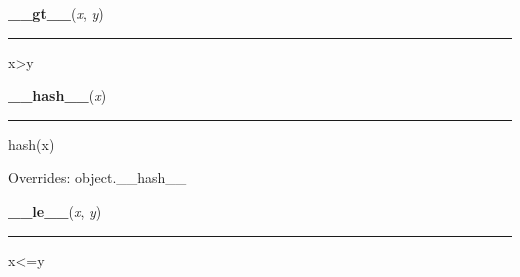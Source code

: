     \label{posix:stat_result:__gt__}

    \vspace{0.5ex}

\hspace{.8\funcindent}\begin{boxedminipage}{\funcwidth}

    \raggedright \textbf{\_\_gt\_\_}(\textit{x}, \textit{y})

    \vspace{-1.5ex}

    \rule{\textwidth}{0.5\fboxrule}
\setlength{\parskip}{2ex}
    x{\textgreater}y

\setlength{\parskip}{1ex}
    \end{boxedminipage}

    \vspace{0.5ex}

\hspace{.8\funcindent}\begin{boxedminipage}{\funcwidth}

    \raggedright \textbf{\_\_hash\_\_}(\textit{x})

    \vspace{-1.5ex}

    \rule{\textwidth}{0.5\fboxrule}
\setlength{\parskip}{2ex}
    hash(x)

\setlength{\parskip}{1ex}
      Overrides: object.\_\_hash\_\_

    \end{boxedminipage}

    \label{posix:stat_result:__le__}

    \vspace{0.5ex}

\hspace{.8\funcindent}\begin{boxedminipage}{\funcwidth}

    \raggedright \textbf{\_\_le\_\_}(\textit{x}, \textit{y})

    \vspace{-1.5ex}

    \rule{\textwidth}{0.5\fboxrule}
\setlength{\parskip}{2ex}
    x{\textless}=y

\setlength{\parskip}{1ex}
    \end{boxedminipage}

    \label{posix:stat_result:__len__}


